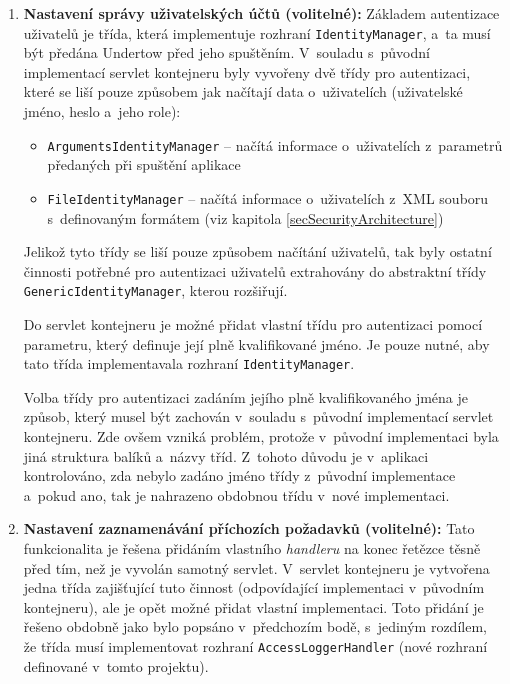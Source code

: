 \begin{enumerate}
                \item \textbf{Nastavení správy uživatelských účtů (volitelné):} Základem autentizace
                    uživatelů je třída, která implementuje rozhraní \texttt{IdentityManager}, a~ta musí
                    být předána Undertow před jeho spuštěním. 
                    V~souladu s~původní implementací servlet kontejneru byly vyvořeny dvě třídy pro autentizaci, které
                    se liší pouze způsobem jak načítají data o~uživatelích (uživatelské jméno, heslo a~jeho role):
                    \begin{itemize}
                        \item \texttt{ArgumentsIdentityManager} -- načítá informace o~uživatelích z~parametrů předaných
                            při spuštění aplikace
                        \item \texttt{FileIdentityManager} -- načítá informace o~uživatelích z~XML souboru s~definovaným formátem 
                            (viz kapitola \ref{secSecurityArchitecture})
                    \end{itemize}

                    Jelikož tyto třídy se liší pouze způsobem načítání uživatelů, tak byly ostatní činnosti potřebné pro
                    autentizaci uživatelů extrahovány 
                    do abstraktní třídy \\\texttt{GenericIdentityManager}, kterou rozšiřují.
                        
                    Do servlet kontejneru je možné přidat vlastní třídu pro autentizaci pomocí parametru,
                    který definuje její plně kvalifikované jméno. Je pouze nutné, aby tato třída implementavala
                    rozhraní \texttt{IdentityManager}.

                    Volba třídy pro autentizaci zadáním jejího plně kvalifikovaného jména
                    je způsob, který musel být zachován v~souladu s~původní implementací servlet kontejneru. 
                    Zde ovšem vzniká problém, protože v~původní implementaci byla jiná struktura balíků
                    a~názvy tříd. Z~tohoto důvodu je v~aplikaci kontrolováno, zda nebylo zadáno
                    jméno třídy z~původní implementace a~pokud ano, tak je 
                    nahrazeno obdobnou třídu v~nové implementaci.
                
                \item \textbf{Nastavení zaznamenávání příchozích požadavků (volitelné):}
                     Tato funkcionalita je řešena přidáním vlastního \emph{handleru} na konec řetězce
                     těsně před tím, než je vyvolán samotný servlet. V~servlet kontejneru je 
                     vytvořena jedna třída zajišťující tuto činnost (odpovídající implementaci v~původním
                     kontejneru), ale je opět možné přidat vlastní implementaci. Toto přidání
                     je řešeno obdobně jako bylo popsáno v~předchozím bodě, s~jediným
                     rozdílem, že 
                     třída musí implementovat rozhraní \texttt{AccessLoggerHandler} (nové
                     rozhraní definované v~tomto projektu).
                     

\end{enumerate}
